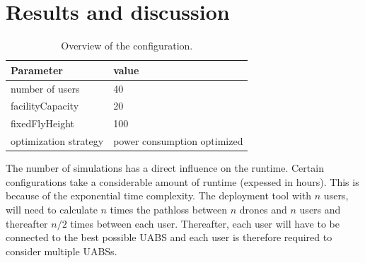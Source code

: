 \chapter{Results and discussion}
\label{chap:results}



\iffalse %
\begin{table}[!htb]
\centering
  \begin{tabular}{|l|l|}
  \hline
  Parameter               & value          \\   \hline 
  number of users               & 40            \\ 
  facilityCapacity                    & 20           \\ 
  fixedFlyHeight               & 100           \\ 
  optimization strategy               & power consumption optimized           \\ 
  \hline
  \end{tabular}
  \caption{Overview of the configuration.}
  \label{table:confOverviewScenario2}
\end{table}

The number of simulations has a direct influence on the runtime. Certain configurations take a considerable amount of runtime (expessed in hours). This is because of the
exponential time complexity. The deployment tool with $n$ users, will need to calculate $n$ times the pathloss between $n$ drones and $n$ users and thereafter $n/2$ times between
each user. Thereafter, each user will have to be connected to the best possible \gls{UABS} and each user is therefore required to consider multiple \gls{UABS}s.

